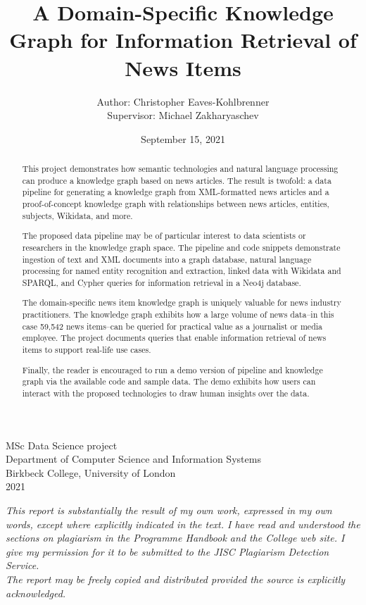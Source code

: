 \documentclass[11pt]{article}
\title{A Domain-Specific Knowledge Graph for Information Retrieval of News Items}
\author{Author: Christopher Eaves-Kohlbrenner \\ Supervisor: Michael Zakharyaschev}
\date{September 15, 2021}
\begin{document}
\maketitle

\begin{center}
\hfill \break
\hfill \break
\hfill \break
MSc Data Science project\\
Department of Computer Science and Information Systems\\
Birkbeck College, University of London\\
2021\\
\hfill \break
\hfill \break
\hfill \break

\textit{This report is substantially the result of my own work, expressed in my own words, except where explicitly indicated in the text. I have read and understood the sections on plagiarism in the Programme Handbook and the College web site. I give my permission for it to be submitted to the JISC Plagiarism Detection Service. \\
\hfill \break
The report may be freely copied and distributed provided the source is explicitly acknowledged.}
\end{center}

\newpage
\begin{abstract}
This project demonstrates how semantic technologies and natural language processing can produce a knowledge graph based on news articles. The result is twofold: a data pipeline for generating a knowledge graph from XML-formatted news articles and a proof-of-concept knowledge graph with relationships between news articles, entities, subjects, Wikidata, and more.

The proposed data pipeline may be of particular interest to data scientists or researchers in the knowledge graph space. The pipeline and code snippets demonstrate ingestion of text and XML documents into a graph database, natural language processing for named entity recognition and extraction, linked data with Wikidata and SPARQL, and Cypher queries for information retrieval in a Neo4j database.

The domain-specific news item knowledge graph is uniquely valuable for news industry practitioners. The knowledge graph exhibits how a large volume of news data--in this case 59,542 news items--can be queried for practical value as a journalist or media employee. The project documents queries that enable information retrieval of news items to support real-life use cases.

Finally, the reader is encouraged to run a demo version of pipeline and knowledge graph via the available code and sample data. The demo exhibits how users can interact with the proposed technologies to draw human insights over the data.


\end{abstract}
\end{document}
